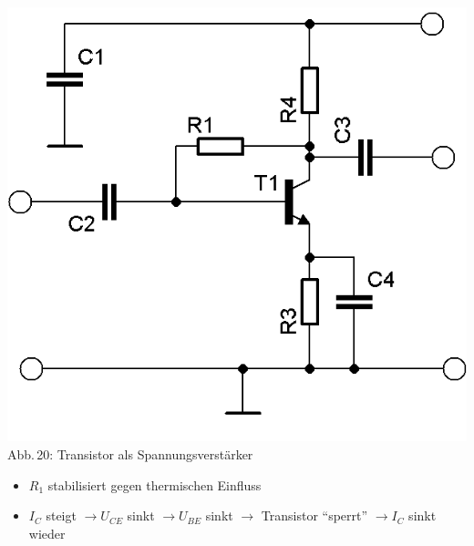 \begin{frame}
  \begin{minipage}{0.4\textwidth}
    \begin{center}
      \includegraphics[width=\textwidth,height=.85\textheight,keepaspectratio]{a06/Transistor-Verstaerker-APstab2a.png}\\
      {\tiny Abb.\,20: Transistor als Spannungsverstärker~\cite{bnetza}}
    \end{center}
  \end{minipage}
  \hspace{3mm}
  \begin{minipage}{0.5\textwidth}
    \begin{itemize}
      \item $R_1$ stabilisiert gegen thermischen Einfluss
      \item $I_C$ steigt $\rightarrow U_{CE}$ sinkt $\rightarrow U_{BE}$ sinkt
        $\rightarrow$ Transistor ``sperrt'' $\rightarrow I_C$ sinkt wieder
    \end{itemize}
  \end{minipage}
\end{frame}

